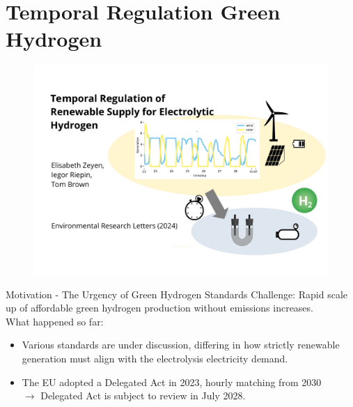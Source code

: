\section{Temporal Regulation Green Hydrogen}
\begin{frame}
	
	\begin{figure}
		\includegraphics[trim={0cm 0cm 0cm 0cm}, width=0.9\linewidth]{images/titlepage_greenh2.pdf}
	\end{figure}
	
\end{frame}

\begin{frame}{Motivation - The Urgency of Green Hydrogen Standards}
	\alert{Challenge}: Rapid scale up of affordable green hydrogen production without emissions increases. \\
	\alert{What happened so far}:
	\begin{itemize}
		\item Various standards are under discussion, differing in how strictly renewable generation must align with the electrolysis electricity demand.
		\item The EU adopted a Delegated Act in 2023, hourly matching from 2030 
		\\ $\rightarrow$ \alert{Delegated Act} is subject to \alert{review in July 2028}.
	\end{itemize} 
\end{frame}

